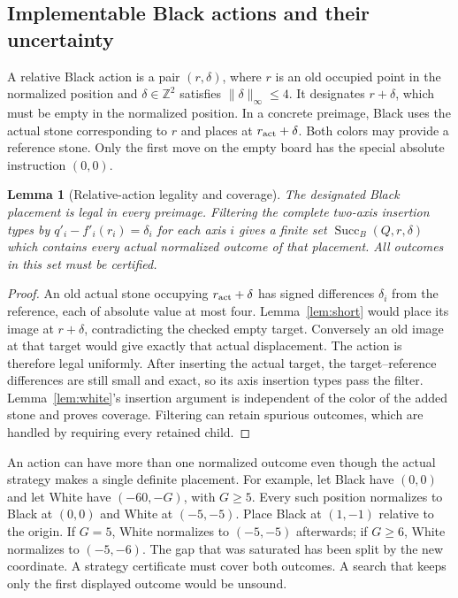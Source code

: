 \documentclass[11pt]{article}
\newtheorem{lemma}[theorem]{Lemma}
\theoremstyle{definition}
\theoremstyle{remark}
\newcommand{\Z}{\mathbb Z}
\newcommand{\Succ}{\operatorname{Succ}}
\begin{document}
\subsection{Implementable Black actions and their uncertainty}
A relative Black action is a pair $(r,\delta)$, where $r$ is an old occupied
point in the normalized position and $\delta\in\Z^2$ satisfies
$\|\delta\|_\infty\leq4$. It designates $r+\delta$, which must be empty in
the normalized position. In a concrete preimage, Black uses the actual
stone corresponding to $r$ and places at $r_{\rm act}+\delta$. Both colors
may provide a reference stone. Only the first move on the empty board has
the special absolute instruction $(0,0)$.

\begin{lemma}[Relative-action legality and coverage]
\label{lem:black}
The designated Black placement is legal in every preimage. Filtering the
complete two-axis insertion types by
$q'_i-f'_i(r_i)=\delta_i$ for each axis $i$ gives a finite set
$\Succ_B(Q,r,\delta)$ which contains every actual normalized outcome of
that placement. All outcomes in this set must be certified.
\end{lemma}
\begin{proof}
An old actual stone occupying $r_{\rm act}+\delta$ has signed differences
$\delta_i$ from the reference, each of absolute value at most four.
Lemma~\ref{lem:short} would place its image at $r+\delta$, contradicting
the checked empty target. Conversely an old image at that target would
give exactly that actual displacement. The action is therefore legal
uniformly. After inserting the actual target, the target--reference
differences are still small and exact, so its axis insertion types pass
the filter. Lemma~\ref{lem:white}'s insertion argument is independent of
the color of the added stone and proves coverage. Filtering can retain
spurious outcomes, which are handled by requiring every retained child.
\end{proof}

An action can have more than one normalized outcome even though the actual
strategy makes a single definite placement. For example, let Black have
$(0,0)$ and let White have $(-60,-G)$, with $G\geq5$. Every such position
normalizes to Black at $(0,0)$ and White at $(-5,-5)$. Place Black at
$(1,-1)$ relative to the origin. If $G=5$, White normalizes to $(-5,-5)$
afterwards; if $G\geq6$, White normalizes to $(-5,-6)$. The gap that was
saturated has been split by the new coordinate. A strategy certificate
must cover both outcomes. A search that keeps only the first displayed
outcome would be unsound.
\end{document}
